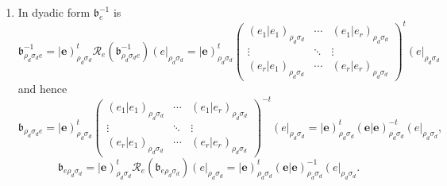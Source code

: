 \documentclass[aps,preprint]{revtex4}
\begin{document}
\begin{enumerate}
\begin{enumerate}
\item In dyadic form $\mathfrak{b}_{e}^{-1}$ is 
\begin{equation}
\mathfrak{b}_{\rho _{d}\sigma _{d}e}^{-1}=\left\vert \boldsymbol{e}\right)
_{\rho _{d}\sigma _{d}}^{t}\mathcal{R}_{e}\left( \overset{}{\mathfrak{b}%
_{\rho _{d}\sigma _{d}e}^{-1}}\right) \left( e\right\vert _{\rho _{d}\sigma
_{d}}=\left\vert \boldsymbol{e}\right) _{\rho _{d}\sigma _{d}}^{t}\left( 
\begin{array}{ccc}
\left( \left. e_{1}\right\vert e_{1}\right) _{\rho _{d}\sigma _{d}} & \cdots
& \left( \left. e_{1}\right\vert e_{r}\right) _{\rho _{d}\sigma _{d}} \\ 
\vdots & \ddots & \vdots \\ 
\left( \left. e_{r}\right\vert e_{1}\right) _{\rho _{d}\sigma _{d}} & \cdots
& \left( \left. e_{r}\right\vert e_{r}\right) _{\rho _{d}\sigma _{d}}%
\end{array}%
\right) ^{t}\left( e\right\vert _{\rho _{d}\sigma _{d}}
\end{equation}%
and hence 
\begin{equation}
\mathfrak{b}_{\rho _{d}\sigma _{d}e}=\left\vert \boldsymbol{e}\right) _{\rho
_{d}\sigma _{d}}^{t}\left( 
\begin{array}{ccc}
\left( \left. e_{1}\right\vert e_{1}\right) _{\rho _{d}\sigma _{d}} & \cdots
& \left( \left. e_{1}\right\vert e_{r}\right) _{\rho _{d}\sigma _{d}} \\ 
\vdots & \ddots & \vdots \\ 
\left( \left. e_{r}\right\vert e_{1}\right) _{\rho _{d}\sigma _{d}} & \cdots
& \left( \left. e_{r}\right\vert e_{r}\right) _{\rho _{d}\sigma _{d}}%
\end{array}%
\right) ^{-t}\left( e\right\vert _{\rho _{d}\sigma _{d}}=\left\vert 
\boldsymbol{e}\right) _{\rho _{d}\sigma _{d}}^{t}\left( \left. \boldsymbol{e}%
\right\vert \boldsymbol{e}\right) _{\rho _{d}\sigma _{d}}^{-t}\left(
e\right\vert _{\rho _{d}\sigma _{d}},
\end{equation}%
\begin{equation}
\mathfrak{b}_{e\rho _{d}\sigma _{d}}=\left\vert \boldsymbol{e}\right) _{\rho
_{d}\sigma _{d}}^{t}\mathcal{R}_{e}\left( \mathfrak{b}_{e\rho _{d}\sigma
_{d}}\right) \left( e\right\vert _{\rho _{d}\sigma _{d}}=\left\vert 
\boldsymbol{e}\right) _{\rho _{d}\sigma _{d}}^{t}\left( \left. \boldsymbol{e}%
\right\vert \boldsymbol{e}\right) _{\rho _{d}\sigma _{d}}^{-1}\left(
e\right\vert _{\rho _{d}\sigma _{d}}.
\end{equation}


\end{enumerate}
\end{enumerate}
\end{document}
